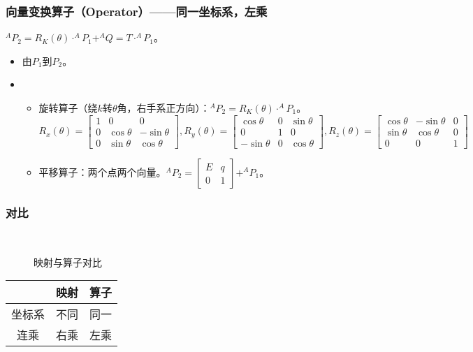 \documentclass[
12pt, %
a4paper, 
oneside, %
headinclude,footinclude, %
]{scrartcl}
\begin{document}
\subsubsection[向量变换算子]{向量变换算子（Operator）——同一坐标系，左乘}
$ ^A P_2 = R_K(\theta) \cdot ^A P_1 + ^A Q= T \cdot ^A P_1 $。
\begin{itemize}
\item 由$ P_1 $到$ P_2 $。
\item 
\begin{itemize}
\item 旋转算子（绕$ k $转$ \theta $角，右手系正方向）：$ ^A P_2 = R_K(\theta) \cdot ^AP_1 $。
$$
R_x(\theta) = \begin{bmatrix} 1 & 0 & 0 \\ 0 & \cos\theta & -\sin\theta \\ 0 & \sin\theta & \cos\theta \end{bmatrix}, 
R_y(\theta) = \begin{bmatrix} \cos\theta & 0 & \sin\theta \\ 0 & 1 & 0 \\ -\sin\theta & 0 & \cos\theta \end{bmatrix}, 
R_z(\theta) = \begin{bmatrix} \cos\theta & -\sin\theta & 0 \\ \sin\theta & \cos\theta & 0 \\ 0 & 0 & 1 \end{bmatrix}
$$
\item 平移算子：两个点两个向量。$ ^A P_2 = \begin{bmatrix} E & q \\ 0 & 1 \end{bmatrix} + ^A P_1 $。
\end{itemize}
\end{itemize}
\subsubsection[对比]{对比}
\begin{minipage}{0.58\textwidth}
\begin{figure}[H]
\centering
{} \quad
{}\\
 \quad
{}
\caption[映射与算子对比]{映射与算子对比}
\end{figure}
\end{minipage}
\hfill
\begin{minipage}{0.38\textwidth}
\centering
{}
\begin{tabular}{c|cc}
\hline
& 映射 & 算子 \\
\hline
坐标系 & 不同 & 同一 \\
连乘 & 右乘 & 左乘 \\
\hline
\end{tabular}
\end{minipage}
\end{document}
